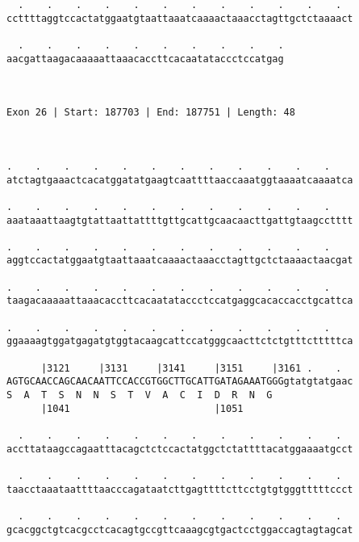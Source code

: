 \documentclass{article}
\begin{document}
\begin{Verbatim}
  .    .    .    .    .    .    .    .    .    .    .    .  
ccttttaggtccactatggaatgtaattaaatcaaaactaaacctagttgctctaaaact
                                                            
  .    .    .    .    .    .    .    .    .    .
aacgattaagacaaaaattaaacaccttcacaatataccctccatgag
                                                
                                                
 
Exon 26 | Start: 187703 | End: 187751 | Length: 48



.    .    .    .    .    .    .    .    .    .    .    .    
atctagtgaaactcacatggatatgaagtcaattttaaccaaatggtaaaatcaaaatca
                                                            
.    .    .    .    .    .    .    .    .    .    .    .    
aaataaattaagtgtattaattattttgttgcattgcaacaacttgattgtaagcctttt
                                                            
.    .    .    .    .    .    .    .    .    .    .    .    
aggtccactatggaatgtaattaaatcaaaactaaacctagttgctctaaaactaacgat
                                                            
.    .    .    .    .    .    .    .    .    .    .    .    
taagacaaaaattaaacaccttcacaatataccctccatgaggcacaccacctgcattca
                                                            
.    .    .    .    .    .    .    .    .    .    .    .    
ggaaaagtggatgagatgtggtacaagcattccatgggcaacttctctgtttctttttca
                                                            
      |3121     |3131     |3141     |3151     |3161 .    .  
AGTGCAACCAGCAACAATTCCACCGTGGCTTGCATTGATAGAAATGGGgtatgtatgaac
S  A  T  S  N  N  S  T  V  A  C  I  D  R  N  G              
      |1041                         |1051                   
  
  .    .    .    .    .    .    .    .    .    .    .    .  
accttataagccagaatttacagctctccactatggctctattttacatggaaaatgcct
                                                            
  .    .    .    .    .    .    .    .    .    .    .    .  
taacctaaataattttaacccagataatcttgagttttcttcctgtgtgggtttttccct
                                                            
  .    .    .    .    .    .    .    .    .    .    .    .  
gcacggctgtcacgcctcacagtgccgttcaaagcgtgactcctggaccagtagtagcat
                                                            

\end{Verbatim}
\end{document}
